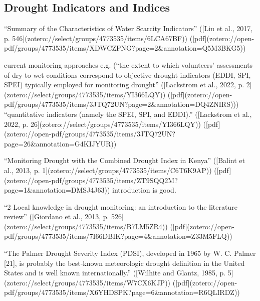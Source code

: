 {%



\subsection{Drought Indicators and Indices}

“Summary of the Characteristics of Water Scarcity Indicators” ([Liu et al., 2017, p. 546](zotero://select/groups/4773535/items/6LCA67BF)) ([pdf](zotero://open-pdf/groups/4773535/items/XDWCZPNG?page=2&annotation=Q5M3BKG5))



current monitoring approaches e.g. (“the extent to which volunteers’ assessments of dry-to-wet conditions correspond to objective drought indicators (EDDI, SPI, SPEI) typically employed for monitoring drought” ([Lackstrom et al., 2022, p. 2](zotero://select/groups/4773535/items/YI366LQY)) ([pdf](zotero://open-pdf/groups/4773535/items/3JTQ72UN?page=2\&annotation=DQ4ZNIRS)))
“quantitative indicators (namely the SPEI, SPI, and EDDI).” ([Lackstrom et al., 2022, p. 26](zotero://select/groups/4773535/items/YI366LQY)) ([pdf](zotero://open-pdf/groups/4773535/items/3JTQ72UN?page=26\&annotation=G4KIJYUR))

“Monitoring Drought with the Combined Drought Index in Kenya” ([Balint et al., 2013, p. 1](zotero://select/groups/4773535/items/C6T6K9AP)) ([pdf](zotero://open-pdf/groups/4773535/items/ZT9SQQ2M?page=1\&annotation=DMSJ4J63))
introduction is good.

“2 Local knowledge in drought monitoring: an introduction to the literature review” ([Giordano et al., 2013, p. 526](zotero://select/groups/4773535/items/B7LM5ZR4)) ([pdf](zotero://open-pdf/groups/4773535/items/7I66DBIK?page=4&annotation=Z33M5FLQ))

“The Palmer Drought Severity Index (PDSI), developed in 1965 by W. C. Palmer [21], is probably the best-known meteorologic drought definition in the United States and is well known internationally.” ([Wilhite and Glantz, 1985, p. 5](zotero://select/groups/4773535/items/W7CX6KJP)) ([pdf](zotero://open-pdf/groups/4773535/items/X6YHDSPK?page=6&annotation=R6QLIRDZ))


}
